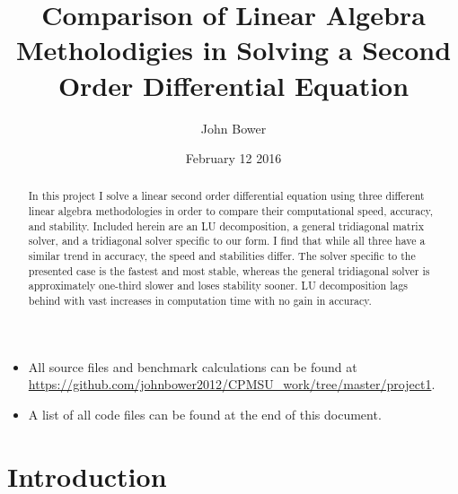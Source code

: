 \documentclass[11pt,a4paper]{article}
\title{Comparison of Linear Algebra Metholodigies in Solving a Second Order Differential Equation}
\author{John Bower}
\date{February 12 2016}
\begin{document}
\maketitle

\begin{abstract}

	In this project I solve a linear second order differential equation using three different linear algebra methodologies in order to compare their computational speed, accuracy, and stability. Included herein are an LU decomposition, a general tridiagonal matrix solver, and a tridiagonal solver specific to our form. I find that while all three have a similar trend in accuracy, the speed and stabilities differ. The solver specific to the presented case is the fastest and most stable, whereas the general tridiagonal solver is approximately one-third slower and loses stability sooner. LU decomposition lags behind with vast increases in computation time with no gain in accuracy.

\end{abstract}

\begin{itemize}
\item All source files and benchmark calculations can be found at \url{https://github.com/johnbower2012/CPMSU_work/tree/master/project1}.
\item A list of all code files can be found at the end of this document.
\end{itemize}

\section{Introduction}
\end{document}
